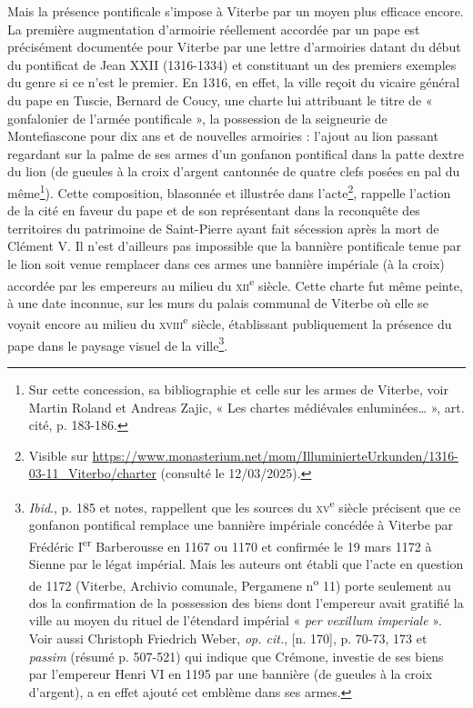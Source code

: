 \documentclass[12pt,twoside,openany]{book}
\begin{document}
Mais la présence pontificale s’impose à Viterbe par un moyen plus efficace encore. La première augmentation d’armoirie réellement accordée par un pape est précisément documentée pour Viterbe par une lettre d’armoiries datant du début du pontificat de Jean XXII (1316-1334) et constituant un des premiers exemples du genre si ce n’est le premier. En 1316, en effet, la ville reçoit du vicaire général du pape en Tuscie, Bernard de Coucy, une charte lui attribuant le titre de « gonfalonier de l’armée pontificale », la possession de la seigneurie de Montefiascone pour dix ans et de nouvelles armoiries : l’ajout au lion passant regardant sur la palme de ses armes d’un gonfanon pontifical dans la patte dextre du lion (de gueules à la croix d’argent cantonnée de quatre clefs posées en pal du même\footnote{Sur cette concession, sa bibliographie et celle sur les armes de Viterbe, voir Martin Roland et Andreas Zajic, « Les chartes médiévales enluminées… », art. cité, p. 183-186.}). Cette composition, blasonnée et illustrée dans l’acte\footnote{Visible sur \href{https://www.monasterium.net/mom/IlluminierteUrkunden/1316-03-11\_Viterbo/charter}{https://www.monasterium.net/mom/IlluminierteUrkunden/1316-03-11\_Viterbo/charter} (consulté le 12/03/2025).}, rappelle l’action de la cité en faveur du pape et de son représentant dans la reconquête des territoires du patrimoine de Saint-Pierre ayant fait sécession après la mort de Clément V. Il n’est d’ailleurs pas impossible que la bannière pontificale tenue par le lion soit venue remplacer dans ces armes une bannière impériale (à la croix) accordée par les empereurs au milieu du \textsc{xii}\textsuperscript{e} siècle. Cette charte fut même peinte, à une date inconnue, sur les murs du palais communal de Viterbe où elle se voyait encore au milieu du \textsc{xviii}\textsuperscript{e} siècle, établissant publiquement la présence du pape dans le paysage visuel de la ville\footnote{\textit{Ibid}., p. 185 et notes, rappellent que les sources du \textsc{xv}\textsuperscript{e} siècle précisent que ce gonfanon pontifical remplace une bannière impériale concédée à Viterbe par Frédéric I\textsuperscript{er} Barberousse en 1167 ou 1170 et confirmée le 19 mars 1172 à Sienne par le légat impérial. Mais les auteurs ont établi que l’acte en question de 1172 (Viterbe, Archivio comunale, Pergamene n\textsuperscript{o} 11) porte seulement au dos la confirmation de la possession des biens dont l’empereur avait gratifié la ville au moyen du rituel de l’étendard impérial « \textit{per vexillum imperiale} ». Voir aussi Christoph Friedrich Weber, \textit{op. cit.}, [n. 170], p. 70-73, 173 et \textit{passim} (résumé p. 507-521) qui indique que Crémone, investie de ses biens par l’empereur Henri VI en 1195 par une bannière (de gueules à la croix d’argent), a en effet ajouté cet emblème dans ses armes.}.
\end{document}

